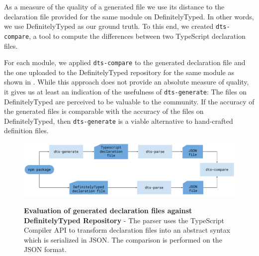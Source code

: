 \documentclass[sigconf]{acmart}
\begin{document}
As a measure of the quality of a generated file we use its distance to
the declaration file provided for the same module on
DefinitelyTyped. In other words, we use DefinitelyTyped as our ground truth.
To this end, we created \texttt{dts-compare}, a tool to compute the
differences between two TypeScript declaration files.

For each module, we applied \texttt{dts-compare} to the generated declaration file and the
one uploaded to the DefinitelyTyped repository for the same module as shown in
. While this approach does not provide an absolute measure
of quality, it gives us at least an indication of the usefulness of \texttt{dts-generate}:
The files on DefinitelyTyped are perceived to be valuable to the community. If the accuracy
of the generated files is comparable with the accuracy of the files on DefinitelyTyped,
then \texttt{dts-generate} is a viable alternative to hand-crafted definition files.

\begin{figure}[tp]
  \begin{centering}
      {\includegraphics[width=1\linewidth]{evaluation-diagram.pdf}}
      \caption[Evaluation against DefinitelyTyped Repository]{\textbf{Evaluation of
          generated declaration files against DefinitelyTyped Repository} - The parser
        uses the TypeScript Compiler           API \cite{typescript-compiler-api} to
        transform declaration files into an abstract syntax which is serialized in
        JSON. The comparison is performed on the JSON format.} 
      \label{fig:evaluation-diagram}
  \end{centering}
\end{figure}
\end{document}
